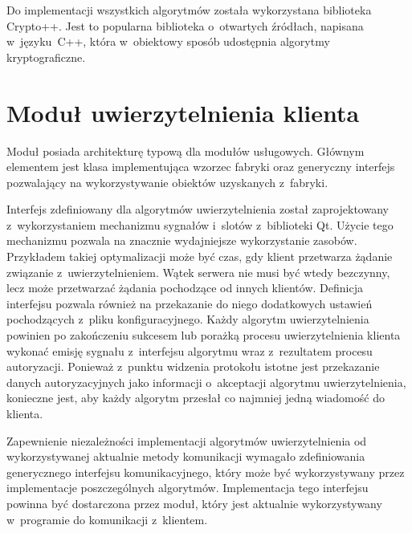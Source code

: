 Do implementacji wszystkich algorytmów została wykorzystana biblioteka
Crypto++. Jest to popularna biblioteka o~otwartych źródłach, napisana
w~języku~C++, która w~obiektowy sposób udostępnia algorytmy
kryptograficzne.

\section[Moduł uwierzytelnienia][Moduł uwierzytelnienia klienta]{Moduł uwierzytelnienia klienta}

Moduł posiada architekturę typową dla modułów usługowych. Głównym
elementem jest klasa implementująca wzorzec fabryki oraz generyczny
interfejs pozwalający na wykorzystywanie obiektów uzyskanych
z~fabryki.

Interfejs zdefiniowany dla algorytmów uwierzytelnienia został
zaprojektowany z~wykorzystaniem mechanizmu sygnałów i~slotów
z~biblioteki Qt. Użycie tego mechanizmu pozwala na znacznie
wydajniejsze wykorzystanie zasobów. Przykładem takiej optymalizacji
może być czas, gdy klient przetwarza żądanie związanie
z~uwierzytelnieniem.  Wątek serwera nie musi być wtedy bezczynny, lecz
może przetwarzać żądania pochodzące od innych klientów. Definicja
interfejsu pozwala również na przekazanie do niego dodatkowych
ustawień pochodzących z~pliku konfiguracyjnego. Każdy algorytm
uwierzytelnienia powinien po zakończeniu sukcesem lub porażką procesu
uwierzytelnienia klienta wykonać emisję sygnału z~interfejsu algorytmu
wraz z~rezultatem procesu autoryzacji. Ponieważ z~punktu widzenia
protokołu istotne jest przekazanie danych autoryzacyjnych jako
informacji o~akceptacji algorytmu uwierzytelnienia, konieczne jest, aby
każdy algorytm przesłał co najmniej jedną wiadomość do klienta.

Zapewnienie niezależności implementacji algorytmów uwierzytelnienia od
wykorzystywanej aktualnie metody komunikacji wymagało zdefiniowania
generycznego interfejsu komunikacyjnego, który może być wykorzystywany
przez implementacje poszczególnych algorytmów. Implementacja tego
interfejsu powinna być dostarczona przez moduł, który jest aktualnie
wykorzystywany w~programie do komunikacji z~klientem.

